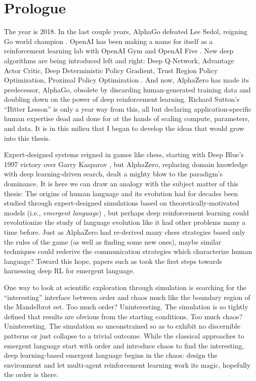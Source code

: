\chapter*{Prologue}\label{ch:prologue}
The year is 2018.
In the last couple years,
  AlphaGo defeated Lee Sedol, reigning Go world champion \citep{bbc-alphago}.
  OpenAI has been making a name for itself as a reinforcement learning lab with OpenAI Gym \citep{openaigym} and OpenAI Five \citep{openai2019dota2largescale}.
  New deep algorithms are being introduced left and right:
    Deep Q-Network, Advantage Actor Critic, Deep Deterministic Policy Gradient, Trust Region Policy Optimization, Proximal Policy Optimization
    \citep{li2018rlhistory}.
And now, AlphaZero \citep{silver2017masteringchessshogiselfplay} has made its predecessor, AlphaGo, obsolete by discarding human-generated training data and doubling down on the power of deep reinforcement learning.
Richard Sutton's ``Bitter Lesson'' is only a year way from this, all but declaring application-specific human expertise dead and done for at the hands of scaling compute, parameters, and data.
It is in this milieu that I began to develop the ideas that would grow into this thesis.

Expert-designed systems reigned in games like chess, starting with Deep Blue's 1997 victory over Garry Kasparov \citep{deepblue}, but AlphaZero, replacing domain knowledge with deep learning-driven search, dealt a mighty blow to the paradigm's dominance.
It is here we can draw an analogy with the subject matter of this thesis:
The origins of human language and its evolution had for decades been studied through expert-designed simulations based on theoretically-motivated models (i.e., \emph{emergent language}) \citep{kirby2002alife}, but perhaps deep reinforcement learning could revolutionize the study of language evolution like it had other problems many a time before.
Just as AlphaZero had re-derived many chess strategies based only the rules of the game (as well as finding some new ones), maybe similar techniques could rederive the communication strategies which characterize human language?
Toward this hope, papers such as \citet{foerster2016learning,lazaridou2016multiagent,havrylov2017emergence}
  took the first steps towards harnessing deep RL for emergent language.

One way to look at scientific exploration through simulation is searching for the ``interesting'' interface between order and chaos much like the boundary region of the Mandelbrot set.
Too much order? Uninteresting.
The simulation is so tightly defined that results are obvious from the starting conditions.
Too much chaos? Uninteresting.
The simulation so unconstrained so as to exhibit no discernible patterns or just collapse to a trivial outcome.
While the classical approaches to emergent language start with order and introduce chaos to find the interesting, deep learning-based emergent language begins in the chaos: design the environment and let multi-agent reinforcement learning work its magic, hopefully the order is there.

